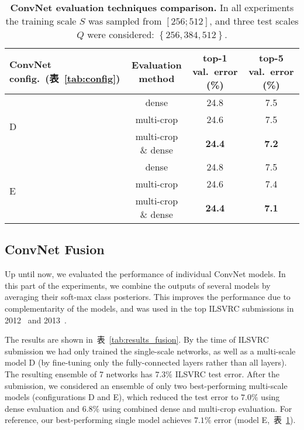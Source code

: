 \documentclass{article} %
\newcommand{\tblref}[1]{表~\ref{#1}}
\begin{document}
\begin{table}[htb]
\small
\centering
\caption{\textbf{ConvNet evaluation techniques comparison.}
In all experiments the training scale $S$ was sampled from $\left[256;512\right]$, and three test scales $Q$ were considered: $\left\{256,384,512\right\}$.
}
\begin{tabular}{|l|c|c|c|} \hline
ConvNet config.\ (\tblref{tab:config}) & Evaluation method & top-1 val.\ error (\%) & top-5 val.\ error (\%) \\ \hline
\multirow{3}{*}{D} & dense & 24.8  & 7.5  \\ \cline{2-4}
& multi-crop & 24.6 & 7.5  \\ \cline{2-4}
& multi-crop \& dense & \textbf{24.4}  & \textbf{7.2}  \\ \hline 
\multirow{3}{*}{E} & dense & 24.8  & 7.5  \\ \cline{2-4}
& multi-crop & 24.6 & 7.4  \\ \cline{2-4}
& multi-crop \& dense & \textbf{24.4}  & \textbf{7.1}  \\ \hline 
\end{tabular}
\label{tab:results_multi_crop}
\end{table}

\subsection{ConvNet Fusion}
\label{sec:fusion}
Up until now, we evaluated the performance of individual ConvNet models.
In this part of the experiments, we combine the outputs of several models by averaging their soft-max class posteriors.
This improves the performance due to complementarity of the models, and was used in the top ILSVRC submissions in 2012~\citep{Krizhevsky12} and 2013~\citep{Zeiler13,Sermanet14}.

The results are shown in~\tblref{tab:results_fusion}.
By the time of ILSVRC submission we had only trained the single-scale networks, as well as a multi-scale model D (by fine-tuning only the fully-connected layers rather than all layers). The resulting ensemble of 7 networks has $7.3\%$ ILSVRC test error.
After the submission, we considered an ensemble of only two best-performing multi-scale models (configurations D and E), which reduced the test error to 
$7.0\%$ using dense evaluation and $6.8\%$ using combined dense and multi-crop evaluation.
For reference, our best-performing single model achieves $7.1\%$ error (model E,~\tblref{tab:results_multi_crop}).
\end{document}
